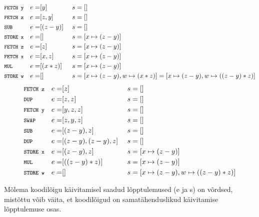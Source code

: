 \begin{align*}
  & \texttt{\footnotesize FETCH y}    & e = & [y]      &\ s & = []\\
  & \texttt{\footnotesize FETCH z}    & e = & [z,y]    &\ s & = []\\
  & \texttt{\footnotesize SUB}        & e = & [(z-y)]  &\ s & = []\\
  & \texttt{\footnotesize STORE x}    & e = & []       &\ s & = [x \mapsto (z-y)]\\
  & \texttt{\footnotesize FETCH z}    & e = & [z]      &\ s & = [x \mapsto (z-y)]\\
  & \texttt{\footnotesize FETCH x}    & e = & [x,z]    &\ s & = [x \mapsto (z-y)]\\
  & \texttt{\footnotesize MUL}        & e = & [(x*z)]  &\ s & = [x \mapsto (z-y)]\\
  & \texttt{\footnotesize STORE w}    & e = & []       &\ s & = [x \mapsto (z-y), w \mapsto (x*z)] = 
    [x \mapsto (z-y), w \mapsto ((z-y)*z)] \\
\end{align*}
\begin{align*}
  & \texttt{\footnotesize FETCH z}  & e = & [z]             &\ s & = []\\
  & \texttt{\footnotesize DUP}      & e = & [z,z]           &\ s & = []\\
  & \texttt{\footnotesize FETCH y}  & e = & [y,z,z]         &\ s & = []\\
  & \texttt{\footnotesize SWAP}     & e = & [z,y,z]         &\ s & = []\\
  & \texttt{\footnotesize SUB}      & e = & [(z-y),z]       &\ s & = []\\
  & \texttt{\footnotesize DUP}      & e = & [(z-y),(z-y),z] &\ s & = []\\
  & \texttt{\footnotesize STORE x}  & e = & [(z-y),z]       &\ s & = [x \mapsto (z-y)]\\
  & \texttt{\footnotesize MUL}      & e = & [((z-y)*z)]     &\ s & = [x \mapsto (z-y)]\\
  & \texttt{\footnotesize STORE w}  & e = & []              &\ s & = [x \mapsto (z-y), w \mapsto ((z-y)*z)]\\
\end{align*}

Mõlema koodilõigu käivitamisel saadud lõpptulemused (e ja s) on võrdsed,
mistõttu võib väita, et koodilõigud on  samatähenduslikud käivitamise
lõpptulemuse osas.
